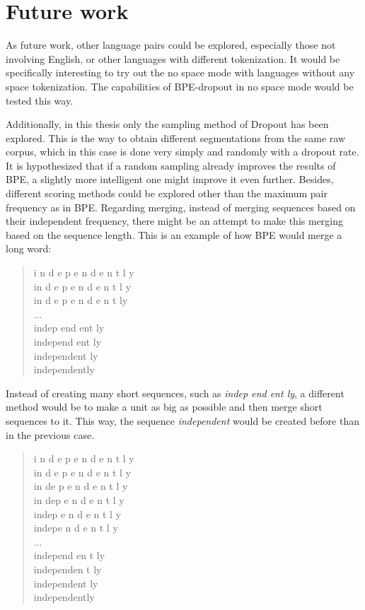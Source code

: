 %
%

\chapter{Future work}\label{ch:futurework}

As future work, other language pairs could be explored, especially those not involving English, or other languages with different tokenization. It would be specifically interesting to try out the no space mode with languages without any space tokenization. The capabilities of BPE-dropout in no space mode would be tested this way.

Additionally, in this thesis only the sampling method of Dropout has been explored. This is the way to obtain different segmentations from the same raw corpus, which in this case is done very simply and randomly with a dropout rate. It is hypothesized that if a random sampling already improves the results of BPE, a slightly more intelligent one might improve it even further. Besides, different scoring methods could be explored other than the maximum pair frequency as in BPE. Regarding merging, instead of merging sequences based on their independent frequency, there might be an attempt to make this merging based on the sequence length. This is an example of how BPE would merge a long word:

\begin{quote}
	i n d e p e n d e n t l y\\
	in d e p e n d e n t l y\\
	in d e p e n d e n t ly\\
	...\\
	indep end ent ly\\
	independ ent ly\\
	independent ly\\
	independently\\
\end{quote}

Instead of creating many short sequences, such as \emph{indep end ent ly}, a different method would be to make a unit as big as possible and then merge short sequences to it. This way, the sequence \emph{independent} would be created before than in the previous case.

\begin{quote}
	i n d e p e n d e n t l y\\
	in d e p e n d e n t l y\\
	in de p e n d e n t l y\\
	in dep e n d e n t l y\\
	indep e n d e n t l y\\
	indepe n d e n t l y\\
	...\\
	independ en t ly\\
	independen t ly\\
	independent ly\\
	independently\\
\end{quote}
